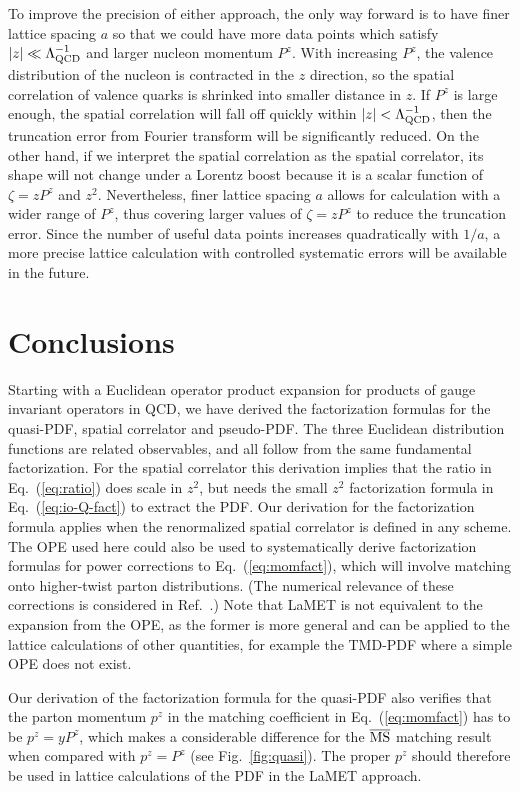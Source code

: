 \documentclass[prd,aps,twocolumn,preprintnumbers,showpacs,nofootinbib,superscriptaddress,notitlepage]{revtex4-1}
\newcommand{\spcorr}{spatial correlator\xspace}
\DeclareRobustCommand{\eq}[1]{Eq.~(\ref{eq:#1})}
\begin{document}
To improve the precision of either approach, the only way forward is to have finer lattice spacing $a$ so that we could have more data points which satisfy $|z|\ll \Lambda_{\rm QCD}^{-1}$ and larger nucleon momentum $P^z$.
With increasing $P^z$, the valence distribution of the nucleon is contracted in the $z$ direction, so the spatial correlation of valence quarks is shrinked into smaller distance in $z$. If $P^z$ is large enough, the spatial correlation will fall off quickly within $|z|< \Lambda_{\rm QCD}^{-1}$, then the truncation error from Fourier transform will be significantly reduced. On the other hand, if we interpret the spatial correlation as the \spcorr, its shape will not change under a Lorentz boost because it is a scalar function of $\zeta=zP^z$ and $z^2$. Nevertheless, finer lattice spacing $a$ allows for calculation with a wider range of $P^z$, thus covering larger values of $\zeta=zP^z$ to reduce the truncation error. Since the number of useful data points increases quadratically with $1/a$, a more precise lattice calculation with controlled systematic errors will be available in the future.

\section{Conclusions}
\label{sec:summary}

Starting with a Euclidean operator product expansion for products of gauge invariant operators in QCD, we have derived the factorization formulas for the quasi-PDF, \spcorr and pseudo-PDF. The three Euclidean distribution functions are related observables, and all follow from the same fundamental factorization.  For the \spcorr this derivation implies that the ratio in Eq.~(\ref{eq:ratio}) does scale in $z^2$, but needs the small $z^2$ factorization formula in \eq{io-Q-fact} to extract the PDF.
%
Our derivation for the factorization formula applies when the renormalized \spcorr is defined in any scheme.
The OPE used here could also be used to systematically derive factorization formulas for power corrections to \eq{momfact}, which will involve matching onto higher-twist parton distributions. (The numerical relevance of these corrections is considered in Ref.~\cite{Chen:2016utp}.)
%
Note that LaMET is not equivalent to the expansion from the OPE, as the former is more general and can be applied to the lattice calculations of other quantities, for example the TMD-PDF where a simple OPE does not exist.

Our derivation of the factorization formula for the quasi-PDF also verifies that the parton momentum $p^z$ in the matching coefficient in Eq.~(\ref{eq:momfact}) has to be $p^z=yP^z$, which makes a considerable difference for the $\overline{\rm MS}$  matching result when compared with $p^z=P^z$ (see Fig.~\ref{fig:quasi}). The proper $p^z$ should therefore be used in lattice calculations of the PDF in the LaMET approach.
\end{document}
